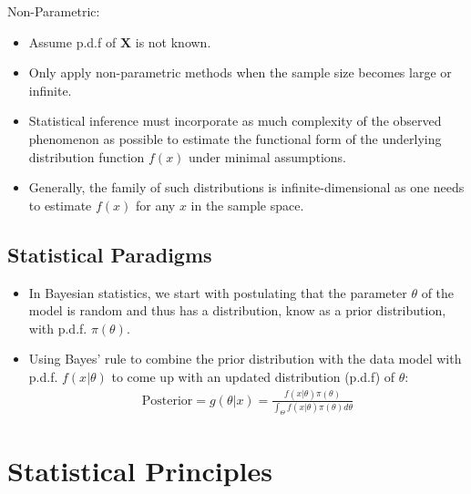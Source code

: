 \documentclass[12pt, oneside]{article}
\newcommand*{\bX}{\bm{X}}
\begin{document}
Non-Parametric: 
\begin{itemize}
    \item Assume p.d.f of $\bX$ is not known. 
    \item Only apply non-parametric methods when the sample size becomes large or infinite.
    \item Statistical inference must incorporate as much complexity of the observed phenomenon as possible to estimate the functional form of the underlying distribution function $f(x)$ under minimal assumptions.
    \item Generally, the family of such distributions is infinite-dimensional as one needs to estimate $f(x)$ for any $x$ in the sample space.
\end{itemize}

\subsection{Statistical Paradigms}
\begin{itemize}
    \item In Bayesian statistics, we start with postulating that the parameter $\theta$ of the model is random and thus has a distribution, know as a prior distribution, with p.d.f. $\pi(\theta)$.
    \item Using Bayes' rule to combine the prior distribution with the data model with p.d.f. $f(x|\theta)$ to come up with an updated distribution (p.d.f) of $\theta$:
    \begin{align*}
        \text{Posterior} = g(\theta|x) = \frac{f(x|\theta)\pi(\theta)}{\int_\Theta f(x|\theta)\pi(\theta)d\theta}
    \end{align*}
\end{itemize}

\section{Statistical Principles}
\end{document}
